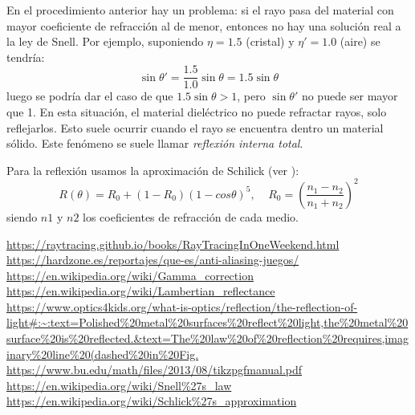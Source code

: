 \documentclass[12pt]{article}
\theoremstyle{definition}
\theoremstyle{remark}
\begin{document}
En el procedimiento anterior hay un problema: si el rayo pasa del material con mayor coeficiente de refracción al de menor, entonces no hay una solución real a la ley de Snell. Por ejemplo, suponiendo $\eta=1.5$ (cristal) y $\eta'=1.0$ (aire) se tendría:
\[
\sin\theta'=\frac{1.5}{1.0}\sin\theta=1.5\sin\theta
\]
luego se podría dar el caso de que $1.5\sin\theta>1$, pero $\sin\theta'$ no puede ser mayor que 1. En esta situación, el material dieléctrico no puede refractar rayos, solo reflejarlos. Esto suele ocurrir cuando el rayo se encuentra dentro un material sólido. Este fenómeno se suele llamar \textit{reflexión interna total}.

Para la reflexión usamos la aproximación de Schilick (ver \cite{schlickapproximation}):
\[
R(\theta)=R_0+(1-R_0)(1-cos\theta)^5, \;\;\;\; R_0=\left(\frac{n_1-n_2}{n_1+n_2}\right)^2
\]
siendo $n1$ y $n2$ los coeficientes de refracción de cada medio.

\begin{thebibliography}{9}
\url{https://raytracing.github.io/books/RayTracingInOneWeekend.html}
\url{https://hardzone.es/reportajes/que-es/anti-aliasing-juegos/}
\url{https://en.wikipedia.org/wiki/Gamma_correction}
\url{https://en.wikipedia.org/wiki/Lambertian_reflectance}
\url{https://www.optics4kids.org/what-is-optics/reflection/the-reflection-of-light#:~:text=Polished%20metal%20surfaces%20reflect%20light,the%20metal%20surface%20is%20reflected.&text=The%20law%20of%20reflection%20requires,imaginary%20line%20(dashed%20in%20Fig.}
\url{https://www.bu.edu/math/files/2013/08/tikzpgfmanual.pdf}
\url{https://en.wikipedia.org/wiki/Snell%27s_law}
\url{https://en.wikipedia.org/wiki/Schlick%27s_approximation}
\end{thebibliography}
\end{document}
